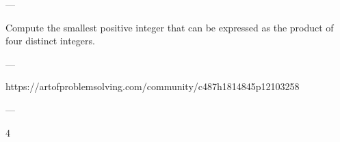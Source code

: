 
---

Compute the smallest positive integer that can be expressed as the product of four distinct integers.

---

https://artofproblemsolving.com/community/c487h1814845p12103258

---

4
